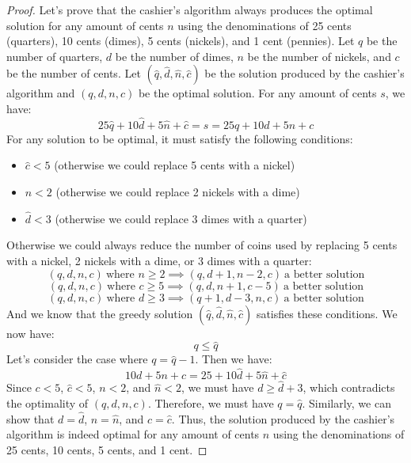 \begin{proof}
    Let's prove that the cashier's algorithm always produces the optimal solution for any amount of cents $n$ using the denominations of 25 cents (quarters), 10 cents (dimes), 5 cents (nickels), and 1 cent (pennies). Let $q$ be the number of quarters, $d$ be the number of dimes, $n$ be the number of nickels, and $c$ be the number of cents. Let $(\hat{q}, \hat{d}, \hat{n}, \hat{c})$ be the solution produced by the cashier's algorithm and $(q, d, n, c)$ be the optimal solution. For any amount of cents $s$, we have:
    \[25\hat{q} + 10\hat{d} + 5\hat{n} + \hat{c} = s = 25q + 10d + 5n + c\]
    For any solution to be optimal, it must satisfy the following conditions:
    \begin{itemize}[itemsep=1pt,label=$\circ$]
        \item $\hat{c} < 5$ (otherwise we could replace 5 cents with a nickel)
        \item $\hat{n} < 2$ (otherwise we could replace 2 nickels with a dime)
        \item $\hat{d} < 3$ (otherwise we could replace 3 dimes with a quarter)
    \end{itemize}
    Otherwise we could always reduce the number of coins used by replacing 5 cents with a nickel, 2 nickels with a dime, or 3 dimes with a quarter:
    \[
        (q, d, n, c) \ \text{where } n \geq 2 \implies (q, d + 1, n - 2, c) \ \text{a better solution}
    \]
    \[
        (q, d, n, c) \ \text{where } c \geq 5 \implies (q, d, n + 1, c - 5) \ \text{a better solution}
    \]
    \[
        (q, d, n, c) \ \text{where } d \geq 3 \implies (q + 1, d - 3, n, c) \ \text{a better solution}
    \]
    And we know that the greedy solution $(\hat{q}, \hat{d}, \hat{n}, \hat{c})$ satisfies these conditions. We now have:
    \[q \leq \hat{q}\]
    Let's consider the case where $q = \hat{q} - 1$. Then we have:
    \[10d + 5n + c = 25 + 10\hat{d} + 5\hat{n} + \hat{c}\]
    Since $c < 5$, $\hat{c} < 5$, $n < 2$, and $\hat{n} < 2$, we must have $d \geq \hat{d} + 3$, which contradicts the optimality of $(q, d, n, c)$. Therefore, we must have $q = \hat{q}$. Similarly, we can show that $d = \hat{d}$, $n = \hat{n}$, and $c = \hat{c}$. Thus, the solution produced by the cashier's algorithm is indeed optimal for any amount of cents $n$ using the denominations of 25 cents, 10 cents, 5 cents, and 1 cent.

\end{proof}
